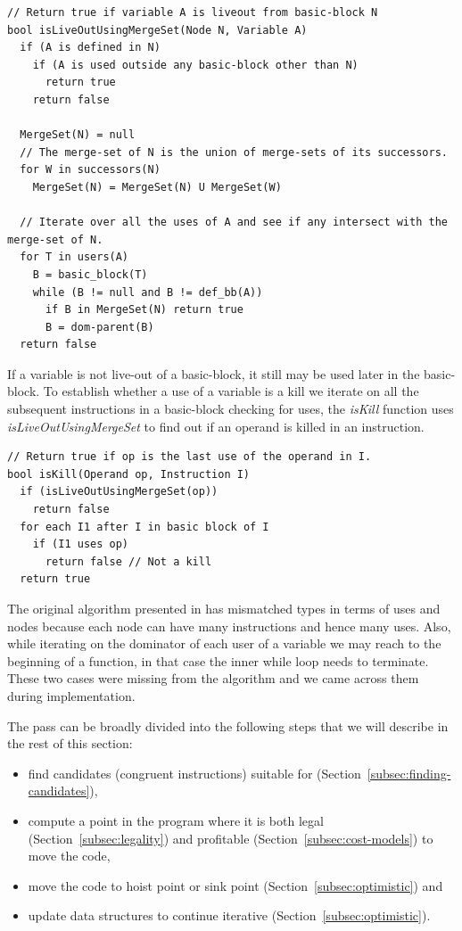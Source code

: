 \documentclass[acmlarge,review,anonymous]{acmart}\settopmatter{printfolios=true}
\begin{document}
\begin{verbatim}
// Return true if variable A is liveout from basic-block N
bool isLiveOutUsingMergeSet(Node N, Variable A)
  if (A is defined in N)
    if (A is used outside any basic-block other than N)
      return true
    return false

  MergeSet(N) = null
  // The merge-set of N is the union of merge-sets of its successors.
  for W in successors(N)
    MergeSet(N) = MergeSet(N) U MergeSet(W)

  // Iterate over all the uses of A and see if any intersect with the merge-set of N.
  for T in users(A)
    B = basic_block(T)
    while (B != null and B != def_bb(A))
      if B in MergeSet(N) return true
      B = dom-parent(B)
  return false
\end{verbatim}

If a variable is not live-out of a basic-block, it still may be used later in
the basic-block. To establish whether a use of a variable is a kill we iterate
on all the subsequent instructions in a basic-block checking for uses, the
\emph{isKill} function uses \emph{isLiveOutUsingMergeSet} to find out if an
operand is killed in an instruction.

\begin{verbatim}
// Return true if op is the last use of the operand in I.
bool isKill(Operand op, Instruction I)
  if (isLiveOutUsingMergeSet(op))
    return false
  for each I1 after I in basic block of I
    if (I1 uses op)
      return false // Not a kill
  return true
\end{verbatim}

The original algorithm presented in \cite{das2012} has mismatched types in terms
of uses and nodes because each node can have many instructions and hence many
uses. Also, while iterating on the dominator of each user of a variable we may
reach to the beginning of a function, in that case the inner while loop needs to
terminate. These two cases were missing from the algorithm and we came across
them during implementation.

The \GCM{} pass can be broadly divided into the following steps that we will
describe in the rest of this section:
\begin{itemize}
\item find candidates (congruent instructions) suitable for \gcm{}
  (Section~\ref{subsec:finding-candidates}),
\item compute a point in the program where it is both legal
  (Section~\ref{subsec:legality}) and profitable
  (Section~\ref{subsec:cost-models}) to move the code,
\item move the code to hoist point or sink point
  (Section~\ref{subsec:optimistic}) and
\item update data structures to continue iterative \gcm{} (Section~\ref{subsec:optimistic}).
\end{itemize}
\end{document}
